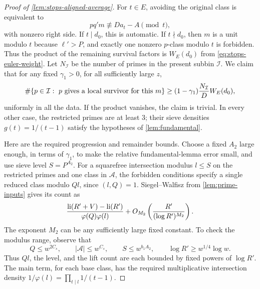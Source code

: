 \begin{proof}[Proof of \cref{lem:stops-aligned-average}]
For $t\in E$, avoiding the original class is equivalent to
\[
 pq'm\not\equiv Da_t-A\pmod t,
\]
with nonzero right side.  If $t\mid d_0$, this is automatic.  If
$t\nmid d_0$, then $m$ is a unit modulo $t$ because $\ell'>P$, and
exactly one nonzero $p$-class modulo $t$ is forbidden.  Thus the
product of the remaining survival factors is
$W_E(d_0)$ from \eqref{eq:stops-euler-weight}.
Let $N_{\mathcal I}$ be the number of primes in the present subbin
$\mathcal I$.  We claim that for any fixed $\gamma_1>0$, for all
sufficiently large $z$,
\begin{equation}\label{eq:stops-tag-prime-count}
 \#\{p\in\mathcal I:\ p\ \hbox{gives a local survivor for this }m\}
 \ge(1-\gamma_1)\frac{N_{\mathcal I}}D W_E(d_0),
\end{equation}
uniformly in all the data.  If the product vanishes, the claim is
trivial.  In every other case, the restricted primes are at least $3$;
their sieve densities $g(t)=1/(t-1)$ satisfy the hypotheses of
\cref{lem:fundamental}.

Here are the required progression and remainder bounds.  Choose a fixed
$A_2$ large enough, in terms of $\gamma_1$, to make the relative
fundamental-lemma error small, and use sieve level
$S=P^{A_2}$.  For a squarefree intersection modulus $l\le S$ on
the restricted primes and one class in $\mathcal A$, the forbidden
conditions specify a single reduced class modulo $Ql$, since
$(l,Q)=1$.  Siegel--Walfisz from \cref{lem:prime-inputs} gives its
count as
\[
 \frac{\operatorname{li}(R'+V)-\operatorname{li}(R')}{\varphi(Q)\varphi(l)}
 +O_{M_2}\left(\frac{R'}{(\log R')^{M_2}}\right).
\]
The exponent $M_2$ can be any sufficiently large fixed constant.  To
check the modulus range, observe that
\begin{equation}\label{eq:stops-sw-size-bounds}
 Q\le w^{2C_s},\qquad |\mathcal A|\le w^{C_s},\qquad
 S\le w^{b_1A_2},\qquad \log R'\ge w^{1/4}\log w.
\end{equation}
Thus $Ql$, the level, and the lift count are each bounded by fixed
powers of $\log R'$.  The main term, for each base class, has the
required multiplicative intersection density
$1/\varphi(l)=\prod_{t\mid l}1/(t-1)$.


\end{proof}
